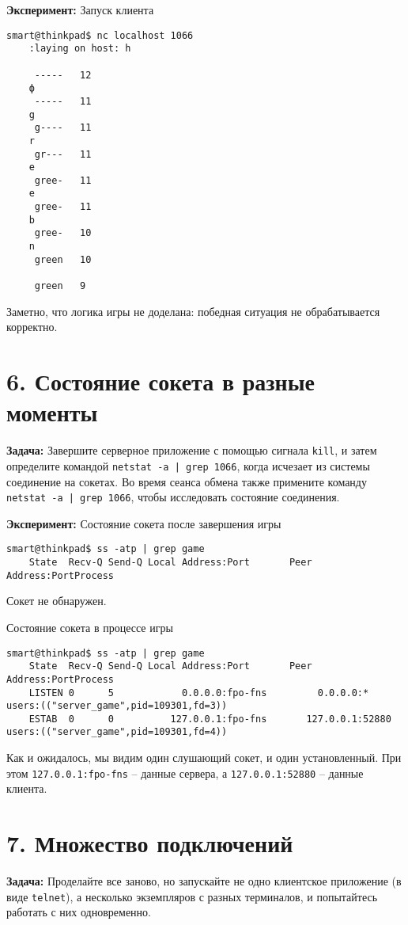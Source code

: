 \textbf{Эксперимент:} Запуск клиента
\begin{Verbatim}[frame=single]
    smart@thinkpad$ nc localhost 1066
    :laying on host: h
    
     -----   12
    ф
     -----   11
    g
     g----   11
    r
     gr---   11
    e
     gree-   11
    e
     gree-   11
    b
     gree-   10
    n
     green   10
    
     green   9
\end{Verbatim}

Заметно, что логика игры не доделана: победная ситуация не обрабатывается корректно.

\section*{6. Состояние сокета в разные моменты}
\textbf{Задача:} Завершите серверное приложение с помощью сигнала \texttt{kill}, и затем определите командой \texttt{netstat -a | grep 1066}, когда исчезает из системы соединение на сокетах. Во время сеанса обмена также примените команду \texttt{netstat -a | grep 1066}, чтобы исследовать состояние соединения.

\textbf{Эксперимент:} Состояние сокета после завершения игры
\begin{Verbatim}[frame=single]
    smart@thinkpad$ ss -atp | grep game
    State  Recv-Q Send-Q Local Address:Port       Peer Address:PortProcess
\end{Verbatim}
Сокет не обнаружен.

Состояние сокета в процессе игры
\begin{Verbatim}[frame=single]
    smart@thinkpad$ ss -atp | grep game
    State  Recv-Q Send-Q Local Address:Port       Peer Address:PortProcess
    LISTEN 0      5            0.0.0.0:fpo-fns         0.0.0.0:*         users:(("server_game",pid=109301,fd=3))
    ESTAB  0      0          127.0.0.1:fpo-fns       127.0.0.1:52880     users:(("server_game",pid=109301,fd=4))
\end{Verbatim}
Как и ожидалось, мы видим один слушающий сокет, и один установленный. При этом \texttt{127.0.0.1:fpo-fns} -- данные сервера, а \texttt{127.0.0.1:52880} -- данные клиента.

\section*{7. Множество подключений}
\textbf{Задача:} Проделайте все заново, но запускайте не одно клиентское приложение (в виде \texttt{telnet}), а несколько экземпляров с разных терминалов, и попытайтесь работать с них одновременно.

